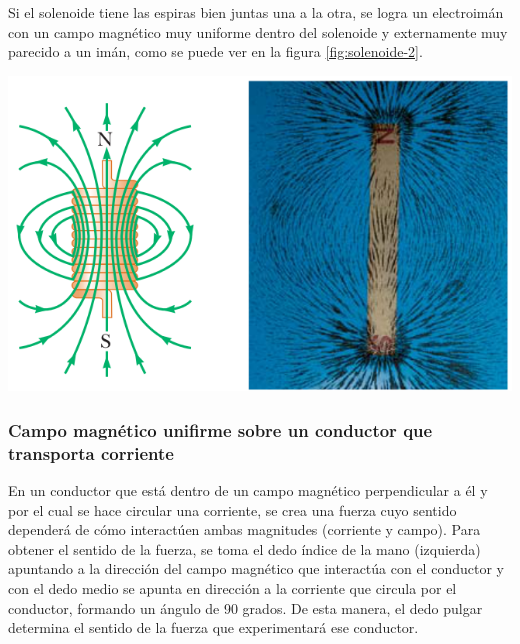 \documentclass{article}
\begin{document}
Si el solenoide tiene las espiras bien juntas una a la otra, se logra un electroimán con un campo magnético muy uniforme dentro del solenoide y externamente muy parecido a un imán, como se puede ver en la figura \ref{fig:solenoide-2}.
\begin{center}
	\includegraphics[scale=0.50]{figuras/solenoide-2.png}
\label{fig:solenoide-2}
\end{center}


\subsubsection{Campo magnético unifirme sobre un conductor que transporta corriente} 

En un conductor que está dentro de un campo magnético perpendicular a él y por el cual se hace circular una corriente, se crea una fuerza cuyo sentido dependerá de cómo interactúen ambas magnitudes (corriente y campo). Para obtener el sentido de la fuerza, se toma el dedo índice de la mano (izquierda) apuntando a la dirección del campo magnético que interactúa con el conductor y con el dedo medio se apunta en dirección a la corriente que circula por el conductor, formando un ángulo de 90 grados. De esta manera, el dedo pulgar determina el sentido de la fuerza que experimentará ese conductor.
\end{document}
